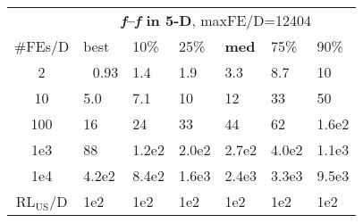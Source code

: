 \begin{tabular}{c|llllll}
 & \multicolumn{6}{|c}{\textbf{\textit{f}\raisebox{-0.35ex}{1}--\textit{f}\raisebox{-0.35ex}{24} in 5-D}, maxFE/D=12404}\\
\#FEs/D & best & 10\% & 25\% & \textbf{med} & 75\% & 90\%\\
2 & ~\,0.93 & \hspace*{1ex}1.4 & \hspace*{1ex}1.9 & \hspace*{1ex}3.3 & \hspace*{1ex}8.7 & 10\\
10 & \hspace*{1ex}5.0 & \hspace*{1ex}7.1 & 10 & 12 & 33 & 50\\
100 & 16 & 24 & 33 & 44 & 62 & 1.6e2\\
1e3 & 88 & 1.2e2 & 2.0e2 & 2.7e2 & 4.0e2 & 1.1e3\\
1e4 & 4.2e2 & 8.4e2 & 1.6e3 & 2.4e3 & 3.3e3 & 9.5e3\\
$\text{RL}_{\text{US}}$/D & 1e2 & 1e2 & 1e2 & 1e2 & 1e2 & 1e2
\end{tabular}
